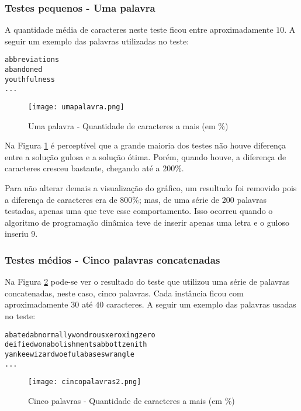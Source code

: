 \documentclass[12pt]{article}
\begin{document}
\subsubsection{Testes pequenos - Uma palavra}
\label{pequeno}

A quantidade média de caracteres neste teste ficou entre aproximadamente $10$. A seguir um exemplo das palavras utilizadas no teste:

\begin{verbatim}
abbreviations
abandoned
youthfulness
...
\end{verbatim}


    \begin{figure}[h!]
        \centering
        \texttt{[image: umapalavra.png]}
        \caption{Uma palavra - Quantidade de caracteres a mais (em \%)}
        \label{umapalavra}
    \end{figure}

    Na Figura \ref{umapalavra} é perceptível que a grande maioria dos testes não houve diferença entre a solução gulosa e a solução ótima. Porém, quando houve, a diferença de caracteres cresceu bastante, chegando até a $200\%$.

    Para não alterar demais a visualização do gráfico, um resultado foi removido pois a diferença de caracteres era de $800\%$; mas, de uma série de 200 palavras testadas, apenas uma que teve esse comportamento. Isso ocorreu quando o algoritmo de programação dinâmica teve de inserir apenas uma letra e o guloso inseriu 9.


\subsubsection{Testes médios - Cinco palavras concatenadas}
\label{medio}

Na Figura \ref{cincopalavras} pode-se ver o resultado do teste que utilizou uma série de palavras concatenadas, neste caso, cinco palavras. Cada instância ficou com aproximadamente $30$ até $40$ caracteres. A seguir um exemplo das palavras usadas no teste:

\begin{verbatim}
abatedabnormallywondrousxeroxingzero
deifiedwonabolishmentsabbottzenith
yankeewizardwoefulabaseswrangle
...
\end{verbatim}


    \begin{figure}[h!]
        \centering
        \texttt{[image: cincopalavras2.png]}
        \caption{Cinco palavras - Quantidade de caracteres a mais (em \%)}
        \label{cincopalavras}
    \end{figure}
\end{document}
